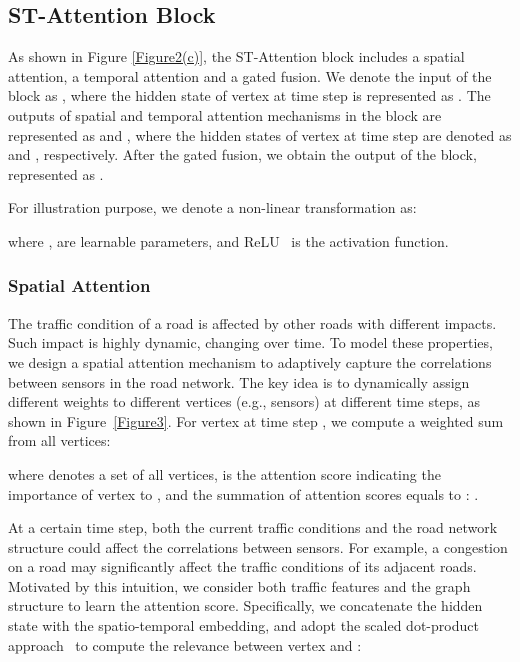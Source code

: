 \documentclass[letterpaper]{article} \usepackage{aaai20}  \usepackage{times}  \usepackage{helvet} \usepackage{courier}  \usepackage[hyphens]{url}  \usepackage{graphicx} \usepackage{amsmath}
\begin{document}
\subsection{ST-Attention Block}

As shown in Figure \ref{Figure2(c)}, the ST-Attention block includes a spatial attention, a temporal attention and a gated fusion. We denote the input of the  block as , where the hidden state of vertex  at time step  is represented as . The outputs of spatial and temporal attention mechanisms in the  block are represented as  and , where the hidden states of vertex  at time step  are denoted as  and , respectively. After the gated fusion, we obtain the output of the  block, represented as .

For illustration purpose, we denote a non-linear transformation as:

where ,  are learnable parameters, and ReLU~\cite{Nair-and-Hinton:ICML2010} is the activation function.

\subsubsection{Spatial Attention}

The traffic condition of a road is affected by other roads with different impacts. Such impact is highly dynamic, changing over time. To model these properties, we design a spatial attention mechanism to adaptively capture the correlations between sensors in the road network. The key idea is to dynamically assign different weights to different vertices (e.g., sensors) at different time steps, as shown in Figure~\ref{Figure3}. For vertex  at time step , we compute a weighted sum from all vertices:

where  denotes a set of all vertices,  is the attention score indicating the importance of vertex  to , and the summation of attention scores equals to : . 

At a certain time step, both the current traffic conditions and the road network structure could affect the correlations between sensors. For example, a congestion on a road may significantly affect the traffic conditions of its adjacent roads. Motivated by this intuition, we consider both traffic features and the graph structure to learn the attention score. Specifically, we concatenate the hidden state with the spatio-temporal embedding, and adopt the scaled dot-product approach~\cite{Vaswani-et-al:NIPS2017} to compute the relevance between vertex  and :
\end{document}
